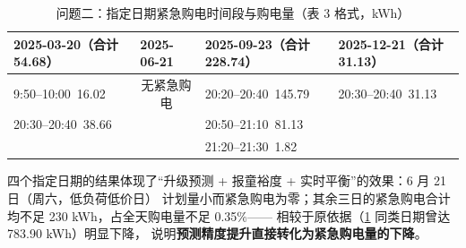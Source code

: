 \begin{table}[htbp]
\centering
\caption{问题二\nobreak：指定日期紧急购电时间段与购电量（表 3 格式\nobreak，kWh\nobreak）}
\label{tab:q2t3}
\begin{tabular}{@{}llll@{}}
\toprule
2025-03-20（合计 54.68\nobreak） & 2025-06-21 & 2025-09-23（合计 228.74\nobreak） & 2025-12-21（合计 31.13\nobreak） \\
\midrule
9:50--10:00\ 16.02 & \multicolumn{1}{c}{无紧急购电} & 20:20--20:40\ 145.79 & 20:30--20:40\ 31.13 \\
20:30--20:40\ 38.66 & & 20:50--21:10\ 81.13 & \\
 & & 21:20--21:30\ 1.82 & \\
\bottomrule
\end{tabular}
\end{table}

四个指定日期的结果体现了“升级预测 + 报童裕度 + 实时平衡\nobreak”的效果\nobreak：6 月 21 日（周六\nobreak，低负荷低价日\nobreak）
计划量小而紧急购电为零\nobreak；其余三日的紧急购电合计均不足 230 kWh\nobreak，占全天购电量不足 0.35\%——
相较于原依据（\cref{tab:q2t3} 同类日期曾达 783.90 kWh\nobreak）明显下降\nobreak，
说明\textbf{预测精度提升直接转化为紧急购电量的下降}\nobreak。
